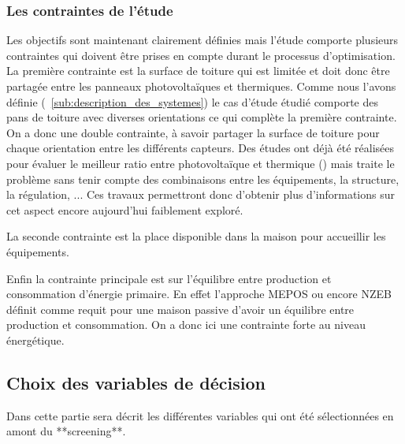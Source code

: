 \subsubsection{Les contraintes de l’étude} %
\label{ssub:les_contraintes_de_l_etude}
Les objectifs sont maintenant clairement définies mais l’étude comporte plusieurs
contraintes qui doivent être prises en compte durant le processus d’optimisation.
La première contrainte est la surface de toiture qui est limitée et doit donc être
partagée entre les panneaux photovoltaïques et thermiques. Comme nous l’avons définie
(~\autoref{sub:description_des_systemes}) le cas d’étude étudié comporte des pans
de toiture avec diverses orientations ce qui complète la première contrainte.
On a donc une double contrainte, à savoir
partager la surface de toiture pour chaque orientation entre les différents capteurs.
Des études ont déjà été réalisées pour évaluer le meilleur ratio entre photovoltaïque
et thermique (\cite{}) mais traite le problème sans tenir compte des combinaisons
entre les équipements, la structure, la régulation, ... Ces travaux permettront donc
d’obtenir plus d’informations sur cet aspect encore aujourd’hui faiblement exploré.

La seconde contrainte est la place disponible dans la maison pour accueillir les
équipements.

Enfin la contrainte principale est sur l’équilibre entre production et consommation
d’énergie primaire. En effet l’approche MEPOS ou encore NZEB définit comme requit
pour une maison passive d’avoir un équilibre entre production et consommation.
On a donc ici une contrainte forte au niveau énergétique.


\subsection{Choix des variables de décision} %
\label{sub:choix_des_variables_de_decision}
Dans cette partie sera décrit les différentes variables qui ont été sélectionnées
en amont du **screening**.





